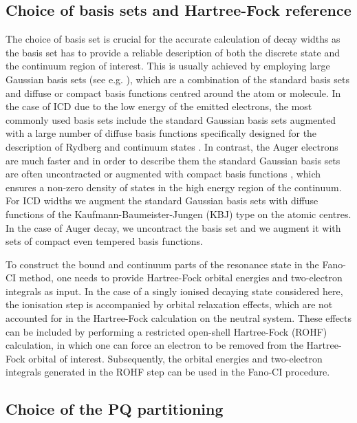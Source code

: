\documentclass[a4paper, 10 pt]{report}
\begin{document}
\subsection{Choice of basis sets and Hartree-Fock reference}\label{ssec:orbitals}

The choice of basis set is crucial for the accurate calculation of decay widths 
as the basis set has to provide a reliable description of both the discrete 
state and the continuum region of interest. This is usually achieved by 
employing large Gaussian basis sets (see e.g. 
\cite{Averbukh05:204107,Kolorenc08:244102,Miteva14:064307,Miteva14:164303,Kolorenc15:224310,Stumpf16:237,Jabbari16:164307}), 
which are a combination of the standard basis sets and diffuse or compact basis 
functions centred around the atom or molecule. In the case of ICD due to the low 
energy of the emitted electrons, the most commonly used basis sets include the 
standard Gaussian basis sets augmented with a large number of diffuse basis 
functions specifically designed for the description of Rydberg and continuum 
states \cite{Kaufmann89:2223}. In contrast, the Auger electrons are much faster 
and in order to describe them the standard Gaussian basis sets are often 
uncontracted or augmented with compact basis functions
\cite{Averbukh05:204107,Stumpf16:237}, which ensures a non-zero density of 
states in the high energy region of the continuum. For ICD widths we augment the standard Gaussian basis sets with diffuse functions of the Kaufmann-Baumeister-Jungen (KBJ) type \cite{Kaufmann89:2223} 
on the atomic centres. In the case of Auger decay, we uncontract the basis set and we augment it with sets of 
compact even tempered basis functions.


To construct the bound and continuum parts of the resonance state in the 
Fano-CI method, one needs to provide Hartree-Fock orbital energies and 
two-electron integrals as input. In the case of a singly ionised decaying state 
considered here, the ionisation step is accompanied by orbital relaxation 
effects, which are not accounted for in the Hartree-Fock calculation on the 
neutral system. These effects can be included by 
performing a restricted open-shell Hartree-Fock (ROHF) calculation, in which one 
can force an electron to be removed from the Hartree-Fock orbital of interest. 
Subsequently, the orbital energies and two-electron integrals generated in the 
ROHF step can be used in the Fano-CI procedure. 

\subsection{Choice of the PQ partitioning}
\end{document}
